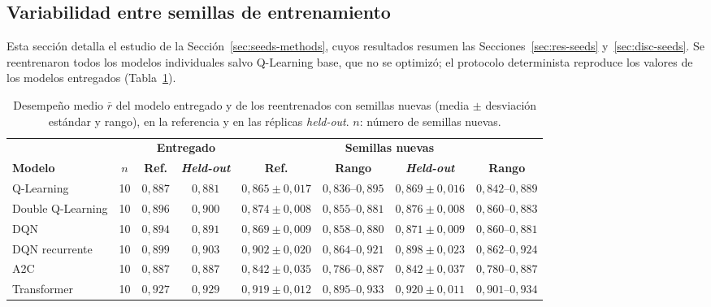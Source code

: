 \documentclass[../00_Main/Main.tex]{subfiles}
\begin{document}
\subsection{Variabilidad entre semillas de entrenamiento}\label{ap:seeds}

Esta secci\'on detalla el estudio de la Secci\'on~\ref{sec:seeds-methods},
cuyos resultados resumen las Secciones~\ref{sec:res-seeds}
y~\ref{sec:disc-seeds}. Se reentrenaron todos los modelos individuales
salvo Q-Learning base, que no se optimiz\'o; el protocolo determinista
reproduce los valores de los modelos entregados (Tabla~\ref{tab:seeds}).

\begin{table}[!t]
\centering
\caption[Variabilidad entre semillas de entrenamiento]{Desempe\~no medio
$\bar r$ del modelo entregado y de los reentrenados con semillas nuevas
(media $\pm$ desviaci\'on est\'andar y rango), en la referencia y en las
r\'eplicas \emph{held-out}. $n$: n\'umero de semillas nuevas.}
\label{tab:seeds}
\footnotesize
\setlength{\tabcolsep}{4pt}
\begin{tabular}{@{}lccccccc@{}}
\toprule
 & & \multicolumn{2}{c}{\textbf{Entregado}} & \multicolumn{4}{c}{\textbf{Semillas nuevas}} \\
\cmidrule(lr){3-4}\cmidrule(lr){5-8}
\textbf{Modelo} & $n$ & \textbf{Ref.} & \textbf{\emph{Held-out}} & \textbf{Ref.} & \textbf{Rango} & \textbf{\emph{Held-out}} & \textbf{Rango} \\
\midrule
Q-Learning        & 10 & $0{,}887$ & $0{,}881$ & $0{,}865 \pm 0{,}017$ & $0{,}836$--$0{,}895$ & $0{,}869 \pm 0{,}016$ & $0{,}842$--$0{,}889$ \\
Double Q-Learning & 10 & $0{,}896$ & $0{,}900$ & $0{,}874 \pm 0{,}008$ & $0{,}855$--$0{,}881$ & $0{,}876 \pm 0{,}008$ & $0{,}860$--$0{,}883$ \\
DQN               & 10 & $0{,}894$ & $0{,}891$ & $0{,}869 \pm 0{,}009$ & $0{,}858$--$0{,}880$ & $0{,}871 \pm 0{,}009$ & $0{,}860$--$0{,}881$ \\
DQN recurrente    & 10 & $0{,}899$ & $0{,}903$ & $0{,}902 \pm 0{,}020$ & $0{,}864$--$0{,}921$ & $0{,}898 \pm 0{,}023$ & $0{,}862$--$0{,}924$ \\
A2C               & 10 & $0{,}887$ & $0{,}887$ & $0{,}842 \pm 0{,}035$ & $0{,}786$--$0{,}887$ & $0{,}842 \pm 0{,}037$ & $0{,}780$--$0{,}887$ \\
Transformer       & 10 & $0{,}927$ & $0{,}929$ & $0{,}919 \pm 0{,}012$ & $0{,}895$--$0{,}933$ & $0{,}920 \pm 0{,}011$ & $0{,}901$--$0{,}934$ \\
\bottomrule
\end{tabular}
\end{table}
\end{document}
